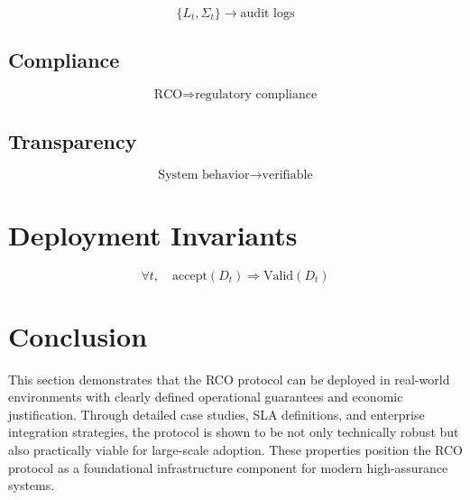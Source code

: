 \begin{equation}
\{L_t, \Sigma_t\} \rightarrow \text{audit logs}
\end{equation}

\subsection{Compliance}

\begin{equation}
\text{RCO} \Rightarrow \text{regulatory compliance}
\end{equation}

\subsection{Transparency}

\begin{equation}
\text{System behavior} \rightarrow \text{verifiable}
\end{equation}

\section{Deployment Invariants}

\begin{equation}
\forall t, \quad \text{accept}(D_t) \Rightarrow \text{Valid}(D_t)
\end{equation}

\section{Conclusion}

This section demonstrates that the RCO protocol can be deployed in real-world environments with clearly defined operational guarantees and economic justification. Through detailed case studies, SLA definitions, and enterprise integration strategies, the protocol is shown to be not only technically robust but also practically viable for large-scale adoption. These properties position the RCO protocol as a foundational infrastructure component for modern high-assurance systems.